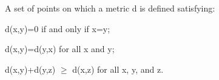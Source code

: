 A set of points on which a metric d is defined satisfying:
\par
d(x,y)=0 if and only if x=y;
\par
d(x,y)=d(y,x) for all x and y;
\par
d(x,y)+d(y,z) $ \geq $ d(x,z) for all x, y, and z.